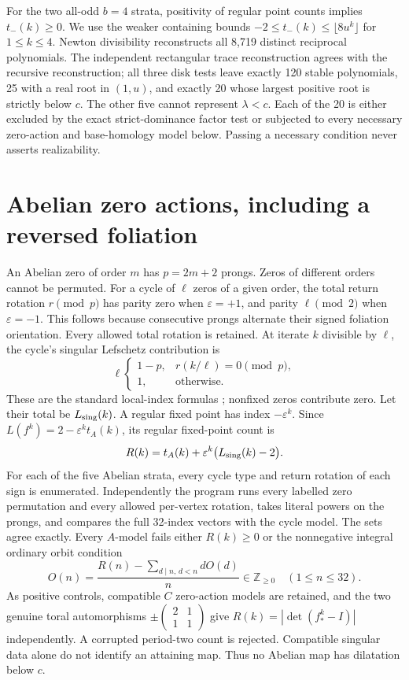\documentclass[11pt]{article}
\begin{document}
For the two all-odd $b=4$ strata, positivity of regular point counts implies
$t_-(k)\geq0$. We use the weaker containing bounds
$-2\leq t_-(k)\leq\lfloor 8u^k\rfloor$ for $1\leq k\leq4$.
Newton divisibility reconstructs all 8,719 distinct reciprocal polynomials.
The independent rectangular trace reconstruction agrees with the recursive
reconstruction; all three disk tests leave exactly 120 stable polynomials,
25 with a real root in $(1,u)$, and exactly 20 whose largest positive root
is strictly below $c$. The other five cannot represent $\lambda<c$.
Each of the 20 is either excluded by the exact strict-dominance factor
test or subjected to every necessary zero-action and base-homology model
below. Passing a necessary condition never asserts realizability.

\section{Abelian zero actions, including a reversed foliation}
An Abelian zero of order $m$ has $p=2m+2$ prongs. Zeros of different orders
cannot be permuted. For a cycle of $\ell$ zeros of a given order, the total
return rotation $r\pmod p$ has parity zero when $\varepsilon=+1$, and
parity $\ell\pmod2$ when $\varepsilon=-1$. This follows because consecutive
prongs alternate their signed foliation orientation. Every allowed total
rotation is retained. At iterate $k$ divisible by $\ell$, the cycle's
singular Lefschetz contribution is
\[
 \ell\begin{cases}1-p,&r(k/\ell)=0\pmod p,\\1,&\text{otherwise}.\end{cases}
\]
These are the standard local-index formulas \cite[Proposition 2.6 and
Corollary 2.7]{LT}; nonfixed zeros contribute zero. Let their total be
$L_{\rm sing}(k)$. A regular fixed point has index $-\varepsilon^k$.
Since $L(f^k)=2-\varepsilon^k t_A(k)$, its regular fixed-point count is
\[
 R(k)=t_A(k)+\varepsilon^k\bigl(L_{\rm sing}(k)-2\bigr).
\]
For each of the five Abelian strata, every cycle type and return rotation
of each sign is enumerated. Independently the program runs every labelled
zero permutation and every allowed per-vertex rotation, takes literal
powers on the prongs, and compares the full 32-index vectors with the
cycle model. The sets agree exactly. Every $A$-model fails either
$R(k)\geq0$ or the nonnegative integral ordinary orbit condition
\[
 O(n)=\frac{R(n)-\sum_{d\mid n,\,d<n}dO(d)}{n}\in\mathbb Z_{\geq0}
 \quad(1\leq n\leq32).
\]
As positive controls, compatible $C$ zero-action models are retained, and
the two genuine toral automorphisms $\pm\begin{pmatrix}2&1\\1&1\end{pmatrix}$
give $R(k)=|\det(f_*^k-I)|$ independently. A corrupted period-two count
is rejected. Compatible singular data alone do not identify an attaining
map. Thus no Abelian map has dilatation below $c$.
\end{document}
